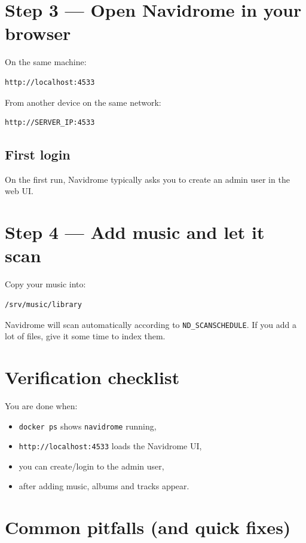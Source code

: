 \section{Step 3 --- Open Navidrome in your browser}
On the same machine:
\begin{lstlisting}
http://localhost:4533
\end{lstlisting}

From another device on the same network:
\begin{lstlisting}
http://SERVER_IP:4533
\end{lstlisting}

\subsection{First login}
On the first run, Navidrome typically asks you to create an admin user in the web UI.


\section{Step 4 --- Add music and let it scan}
Copy your music into:
\begin{lstlisting}
/srv/music/library
\end{lstlisting}

Navidrome will scan automatically according to \texttt{ND\_SCANSCHEDULE}.
If you add a lot of files, give it some time to index them.

\section{Verification checklist}
You are done when:
\begin{itemize}[leftmargin=*]
  \item \texttt{docker ps} shows \texttt{navidrome} running,
  \item \texttt{http://localhost:4533} loads the Navidrome UI,
  \item you can create/login to the admin user,
  \item after adding music, albums and tracks appear.
\end{itemize}

\section{Common pitfalls (and quick fixes)}
